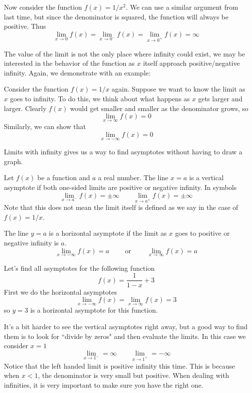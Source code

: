 \begin{example}
	Now consider the function $f(x) = 1/x^2$. We can use a similar argument from last time, but since the denominator is squared, the function will always be positive. Thus
	\[ \lim_{x \to 0} f(x) = \lim_{x \to 0^-} f(x) = \lim_{x \to 0^+} f(x) = \infty \]
\end{example}

The value of the limit is not the only place where infinity could exist, we may be interested in the behavior of the function as $x$ itself approach positive/negative infinity. Again, we demonstrate with an example:

\begin{example}
	Consider the function $f(x) = 1/x$ again. Suppose we want to know the limit as $x$ goes to infinity. To do this, we think about what happens as $x$ gets larger and larger. Clearly $f(x)$ would get smaller and smaller as the denominator grows, so
	\[ \lim_{x \to \infty} f(x) = 0 \]
	Similarly, we can show that
	\[ \lim_{x \to -\infty} f(x) = 0 \]
\end{example}

Limits with infinity gives us a way to find asymptotes without having to draw a graph.
\begin{theorem}[Asymptotes]
	Let $f(x)$ be a function and $a$ a real number. The line $x = a$ is a vertical asymptote if both one-sided limits are positive or negative infinity. In symbols
	\[ \lim_{x \to a^-} f(x) = \pm \infty \qquad \lim_{x \to a^+} f(x) = \pm \infty \]
	Note that this does not mean the limit itself is defined as we say in the case of $f(x) = 1/x$. 
	
	The line $y = a$ is a horizontal asymptote if the limit as $x$ goes to positive or negative infinity is $a$.
	\[ \lim_{x \to -\infty} f(x) = a \qquad \text{ or } \qquad \lim_{x \to \infty} f(x) = a \]
\end{theorem}

\begin{example}
	Let's find all asymptotes for the following function
	\[ f(x) = \frac{1}{1 - x} + 3 \]
	First we do the horizontal asymptotes
	\[ \lim_{x \to -\infty} f(x) = \lim_{x \to \infty} f(x) = 3 \]
	so $y = 3$ is a horizontal asymptote for this function.
	
	It's a bit harder to see the vertical asymptotes right away, but a good way to find them is to look for ``divide by zeros" and then evaluate the limits. In this case we consider $x = 1$
	\[ \lim_{x \to 1^-} = \infty \qquad \lim_{x \to 1^+} = - \infty \]
	Notice that the left handed limit is positive infinity this time. This is because when $x < 1$, the denominator is very small but positive. When dealing with infinities, it is very important to make sure you have the right one.
\end{example}

